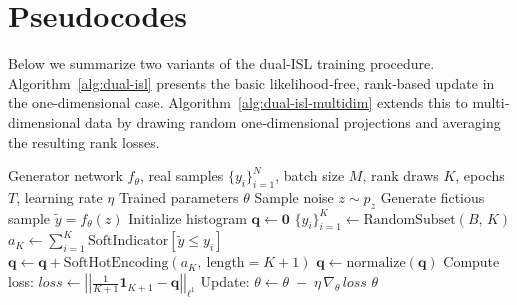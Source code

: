 \documentclass{article}
\begin{document}
\newpage \clearpage

\section{Pseudocodes} \label{pseudocodes}
Below we summarize two variants of the dual‐ISL training procedure.  Algorithm~\ref{alg:dual-isl} presents the basic likelihood‐free, rank‐based update in the one‐dimensional case.  Algorithm~\ref{alg:dual-isl-multidim} extends this to multi‐dimensional data by drawing random one‐dimensional projections and averaging the resulting rank losses.

\begin{algorithm}[ht!]
\caption{dual-ISL Training}\label{alg:dual-isl}
\begin{algorithmic}[1]
  \REQUIRE Generator network $f_{\theta}$, real samples $\{y_i\}_{i=1}^N$, batch size $M$, rank draws $K$, epochs $T$, learning rate $\eta$
  \ENSURE  Trained parameters $\theta$
      \STATE Sample noise $z \sim p_z$
      \STATE Generate fictious sample $\tilde y = f_\theta(z)$
      \STATE Initialize histogram $\mathbf{q} \leftarrow \mathbf{0}$
        \STATE $\{y_i\}_{i=1}^{K} \gets \text{RandomSubset}(B,\,K)$  
        \STATE $a_K \leftarrow \sum_{i=1}^K \mathrm{SoftIndicator}[\tilde y \le y_{i}]$ 
        \STATE $\mathbf{q}\leftarrow \mathbf{q} + \mathrm{SoftHotEncoding}(a_K,\ \text{length}=K+1)$ 
      \ENDFOR
      \STATE $\mathbf{q} \leftarrow \mathrm{normalize}(\mathbf{q})$
      \STATE Compute loss: $\mathit{loss} \leftarrow \left|\left|\frac{1}{K+1}\mathbf{1}_{K+1}-\mathbf{q}\right|\right|_{\ell^1}$
      \STATE Update: $\theta \leftarrow \theta \;-\;\eta\,\nabla_{\theta}\,\mathit{loss}$
    \ENDFOR
  \ENDFOR 
  \RETURN $\theta$
\end{algorithmic}
\end{algorithm}
\end{document}
